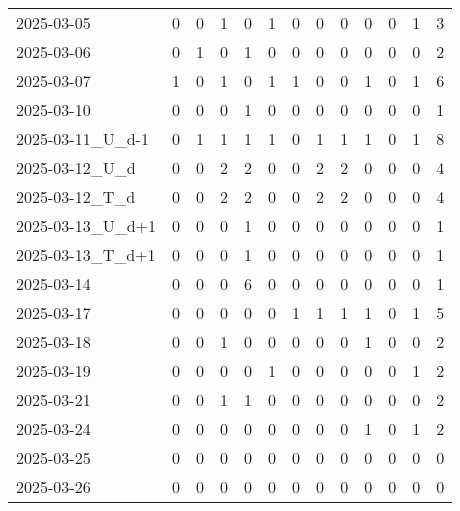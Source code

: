 \documentclass[dvipdfmx,oneside]{article}
\begin{document}
\begin{longtable}{lcccccccccccc}
        2025-03-05 &     0 &     0 &     1 &     0 &     1 &     0 &     0 &     0 &     0 &     0 &     1 &      3 \\
        2025-03-06 &     0 &     1 &     0 &     1 &     0 &     0 &     0 &     0 &     0 &     0 &     0 &      2 \\
        2025-03-07 &     1 &     0 &     1 &     0 &     1 &     1 &     0 &     0 &     1 &     0 &     1 &      6 \\
        2025-03-10 &     0 &     0 &     0 &     1 &     0 &     0 &     0 &     0 &     0 &     0 &     0 &      1 \\
2025-03-11\_U\_d-1 &     0 &     1 &     1 &     1 &     1 &     0 &     1 &     1 &     1 &     0 &     1 &      8 \\
  2025-03-12\_U\_d &     0 &     0 &     2 &     2 &     0 &     0 &     2 &     2 &     0 &     0 &     0 &      4 \\
  2025-03-12\_T\_d &     0 &     0 &     2 &     2 &     0 &     0 &     2 &     2 &     0 &     0 &     0 &      4 \\
2025-03-13\_U\_d+1 &     0 &     0 &     0 &     1 &     0 &     0 &     0 &     0 &     0 &     0 &     0 &      1 \\
2025-03-13\_T\_d+1 &     0 &     0 &     0 &     1 &     0 &     0 &     0 &     0 &     0 &     0 &     0 &      1 \\
        2025-03-14 &     0 &     0 &     0 &     6 &     0 &     0 &     0 &     0 &     0 &     0 &     0 &      1 \\
        2025-03-17 &     0 &     0 &     0 &     0 &     0 &     1 &     1 &     1 &     1 &     0 &     1 &      5 \\
        2025-03-18 &     0 &     0 &     1 &     0 &     0 &     0 &     0 &     0 &     1 &     0 &     0 &      2 \\
        2025-03-19 &     0 &     0 &     0 &     0 &     1 &     0 &     0 &     0 &     0 &     0 &     1 &      2 \\
        2025-03-21 &     0 &     0 &     1 &     1 &     0 &     0 &     0 &     0 &     0 &     0 &     0 &      2 \\
        2025-03-24 &     0 &     0 &     0 &     0 &     0 &     0 &     0 &     0 &     1 &     0 &     1 &      2 \\
        2025-03-25 &     0 &     0 &     0 &     0 &     0 &     0 &     0 &     0 &     0 &     0 &     0 &      0 \\
        2025-03-26 &     0 &     0 &     0 &     0 &     0 &     0 &     0 &     0 &     0 &     0 &     0 &      0 \\

\end{longtable}
\end{document}
